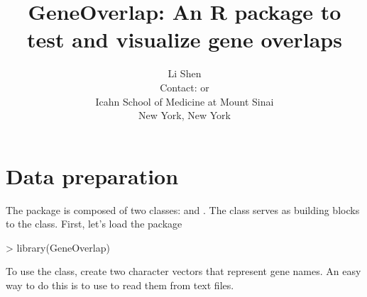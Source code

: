 \documentclass{article}
\title{GeneOverlap: An R package to test and visualize gene overlaps}
\author{Li Shen\\
Contact: \email{li.shen@mssm.edu} or \email{shenli.sam@gmail.com}\\
Icahn School of Medicine at Mount Sinai\\
New York, New York}
\begin{document}


\maketitle

\tableofcontents

\section{Data preparation} \label{sec:prep}
The  package is composed of two classes:  and . The  class serves as building blocks to the  class. First, let's load the package
\begin{Schunk}
\begin{Sinput}
> library(GeneOverlap)
\end{Sinput}
\end{Schunk}
To use the  class, create two character vectors that represent gene names. An easy way to do this is to use  to read them from text files. 
\end{document}
